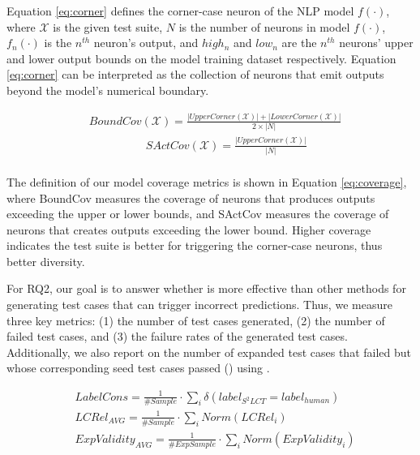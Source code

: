 \noindent Equation \ref{eq:corner} defines the corner-case neuron of the NLP model $f(\cdot)$, where $\mathcal{X}$ is the given test suite, $N$ is the number of neurons in model $f(\cdot)$, $f_n(\cdot)$ is the $n^{th}$ neuron's output, and $high_n$ and $low_n$ are the $n^{th}$ neurons' upper and lower output bounds on the model training dataset respectively.
Equation \ref{eq:corner} can be interpreted as the collection of neurons that emit outputs beyond the model's numerical boundary.

\begin{small}
\begin{equation}
\begin{split}
     & BoundCov(\mathcal{X}) = \frac{|UpperCorner(\mathcal{X})| + |LowerCorner(\mathcal{X})| }{2 \times |N|} \\ 
     &\quad  \qquad \qquad  SActCov(\mathcal{X}) = \frac{|UpperCorner(\mathcal{X})|} {|N|} \\ 
\end{split}
    \label{eq:coverage}
\end{equation}
\end{small}

\noindent The definition of our model coverage metrics is shown in Equation \ref{eq:coverage}, where BoundCov measures the coverage of neurons that produces outputs exceeding the upper or lower bounds, and SActCov measures the coverage of neurons that creates outputs exceeding the lower bound.
Higher coverage indicates the test suite is better for triggering the corner-case neurons, thus better diversity. 



For RQ2, our goal is to answer whether \tool is more effective than other methods for generating test cases that can trigger incorrect predictions. Thus, we measure three key metrics: (1) the number of test cases generated, (2) the number of failed test cases, and (3) the failure rates of the generated test cases. Additionally, we also report on the number of expanded test cases that failed but whose corresponding seed test cases passed (\Ptf) using \tool.



\begin{equation}
\label{eq:consistency}
\begin{split}
    &  LabelCons = \frac{1}{\#Sample}\cdot \sum_{i}\delta(label_{S^2LCT}=label_{human}) \\
    & LCRel_{AVG} = \frac{1}{\#Sample}\cdot\sum_{i} Norm(LCRel_i)   \\
    &  ExpValidity_{AVG} = \frac{1}{\#ExpSample}\cdot\sum_{i} Norm(ExpValidity_i)  
\end{split}
\end{equation}

